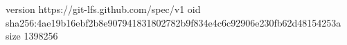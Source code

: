 version https://git-lfs.github.com/spec/v1
oid sha256:4ae19b16ebf2b8e907941831802782b9f834e4c6c92906e230fb62d48154253a
size 1398256
